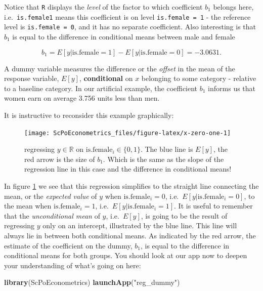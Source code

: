 \documentclass[]{book}
\newenvironment{Shaded}{\begin{snugshade}}{\end{snugshade}}
\newcommand{\KeywordTok}[1]{\textcolor[rgb]{0.13,0.29,0.53}{\textbf{#1}}}
\newcommand{\NormalTok}[1]{#1}
\newcommand{\StringTok}[1]{\textcolor[rgb]{0.31,0.60,0.02}{#1}}
\newenvironment{note}{\begin{tcolorbox}[colback=blue!5!white,colframe=blue!75!black]}{\end{tcolorbox}}
\begin{document}
Notice that \texttt{R} displays the \emph{level} of the factor to which coefficient \(b_1\) belongs here, i.e.~\texttt{is.female1} means this coefficient is on level \texttt{is.female\ =\ 1} - the reference level is \texttt{is.female\ =\ 0}, and it has no separate coefficient. Also interesting is that \(b_1\) is equal to the difference in conditional means between male and female

\[b_1 = E[y|\text{is.female}=1] - E[y|\text{is.female}=0]=-3.0631.\]

\begin{note}
A dummy variable measures the difference or the \emph{offset} in the
mean of the response variable, \(E[y]\), \textbf{conditional} on \(x\)
belonging to some category - relative to a baseline category. In our
artificial example, the coefficient \(b_1\) informs us that women earn
on average 3.756 units less than men.
\end{note}

It is instructive to reconsider this example graphically:

\begin{figure}

{\centering \texttt{[image: ScPoEconometrics\_files/figure-latex/x-zero-one-1]} 

}

\caption{regressing $y \in \mathbb{R}$ on $\text{is.female}_i \in \{0,1\}$. The blue line is $E[y]$, the red arrow is the size of $b_1$. Which is the same as the slope of the regression line in this case and the difference in conditional means!}\label{fig:x-zero-one}
\end{figure}

In figure \ref{fig:x-zero-one} we see that this regression simplifies to the straight line connecting the mean, or the \emph{expected value} of \(y\) when \(\text{is.female}_i = 0\), i.e.~\(E[y|\text{is.female}_i=0]\), to the mean when \(\text{is.female}_i=1\), i.e.~\(E[y|\text{is.female}_i=1]\). It is useful to remember that the \emph{unconditional mean} of \(y\), i.e.~\(E[y]\), is going to be the result of regressing \(y\) only on an intercept, illustrated by the blue line. This line will always lie in between both conditional means. As indicated by the red arrow, the estimate of the coefficient on the dummy, \(b_1\), is equal to the difference in conditional means for both groups. You should look at our app now to deepen your understanding of what's going on here:

\begin{Shaded}
\begin{Highlighting}[]
\KeywordTok{library}\NormalTok{(ScPoEconometrics)}
\KeywordTok{launchApp}\NormalTok{(}\StringTok{"reg_dummy"}\NormalTok{)}
\end{Highlighting}
\end{Shaded}
\end{document}
